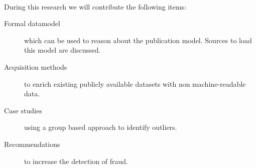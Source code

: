 \documentclass{ou-report}
\newcommand{\outline}[1]{{\color{blue} #1}}
\newcommand{\old}[1]{{\color{gray} #1}}
\begin{document}
\paragraph{}
During this research we will contribute the following items:
\begin{description}
    \item[Formal datamodel] which can be used to reason about the publication model.
        Sources to load this model are discussed.
    \item[Acquisition methods] to enrich existing publicly available datasets with
        non machine-readable data.
    \item[Case studies] using a group based approach to identify outliers.
    \item[Recommendations] to increase the detection of fraud. 
\end{description}
\end{document}
